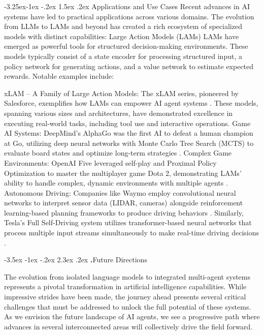 \documentclass[journal,twoside,10pt]{IEEEtran}
\makeatletter
\renewcommand\section{\@startsection{section}{1}{\z@}%
                       {-3.5ex \@plus -1ex \@minus -.2ex}%
                       {2.3ex \@plus.2ex}%
                       {\normalfont\Large\bfseries\Roman{section}.\quad}}
\renewcommand\subsection{\@startsection{subsection}{2}{\z@}%
                       {-3.25ex\@plus -1ex \@minus -.2ex}%
                       {1.5ex \@plus .2ex}%
                       {\normalfont\large\bfseries}}
\makeatother
\begin{document}
\subsection{Applications and Use Cases}
Recent advances in AI systems have led to practical applications across various domains. The evolution from LLMs to LAMs and beyond has created a rich ecosystem of specialized models with distinct capabilities:
Large Action Models (LAMs)
LAMs have emerged as powerful tools for structured decision-making environments. These models typically consist of a state encoder for processing structured input, a policy network for generating actions, and a value network to estimate expected rewards. Notable examples include:

xLAM – A Family of Large Action Models: The xLAM series, pioneered by Salesforce, exemplifies how LAMs can empower AI agent systems \cite{zhang2024xlam}. These models, spanning various sizes and architectures, have demonstrated excellence in executing real-world tasks, including tool use and interactive operations.
Game AI Systems: DeepMind's AlphaGo was the first AI to defeat a human champion at Go, utilizing deep neural networks with Monte Carlo Tree Search (MCTS) to evaluate board states and optimize long-term strategies \cite{silver2016mastering}.
Complex Game Environments: OpenAI Five leveraged self-play and Proximal Policy Optimization to master the multiplayer game Dota 2, demonstrating LAMs' ability to handle complex, dynamic environments with multiple agents \cite{openai2019dota}.
Autonomous Driving: Companies like Waymo employ convolutional neural networks to interpret sensor data (LIDAR, cameras) alongside reinforcement learning-based planning frameworks to produce driving behaviors \cite{bojarski2016end}. Similarly, Tesla's Full Self-Driving system utilizes transformer-based neural networks that process multiple input streams simultaneously to make real-time driving decisions \cite{lambert2023tesla}. 

\section{Future Directions} 


The evolution from isolated language models to integrated multi-agent systems represents a pivotal transformation in artificial intelligence capabilities. While impressive strides have been made, the journey ahead presents several critical challenges that must be addressed to unlock the full potential of these systems. As we envision the future landscape of AI agents, we see a progressive path where advances in several interconnected areas will collectively drive the field forward.
\end{document}
